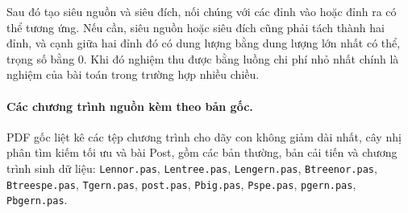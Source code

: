 \documentclass[11pt]{article}
\begin{document}
Sau đó tạo siêu nguồn và siêu đích, nối chúng với các đỉnh vào hoặc đỉnh ra
có thể tương ứng. Nếu cần, siêu nguồn hoặc siêu đích cũng phải tách thành hai
đỉnh, và cạnh giữa hai đỉnh đó có dung lượng bằng dung lượng lớn nhất có thể,
trọng số bằng \(0\). Khi đó nghiệm thu được bằng luồng chi phí nhỏ nhất chính
là nghiệm của bài toán trong trường hợp nhiều chiều.

\paragraph{Các chương trình nguồn kèm theo bản gốc.}
PDF gốc liệt kê các tệp chương trình cho dãy con không giảm dài nhất, cây nhị
phân tìm kiếm tối ưu và bài Post, gồm các bản thường, bản cải tiến và chương
trình sinh dữ liệu: \texttt{Lennor.pas}, \texttt{Lentree.pas},
\texttt{Lengern.pas}, \texttt{Btreenor.pas}, \texttt{Btreespe.pas},
\texttt{Tgern.pas}, \texttt{post.pas}, \texttt{Pbig.pas},
\texttt{Pspe.pas}, \texttt{pgern.pas}, \texttt{Pbgern.pas}.
\end{document}
